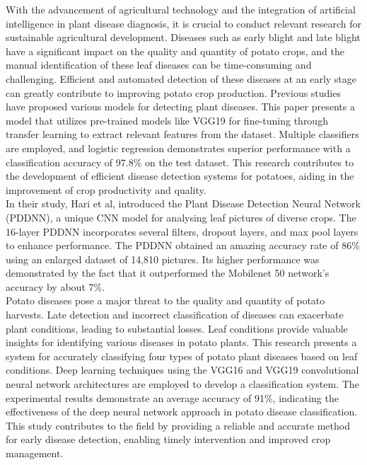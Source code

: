 \documentclass[conference]{IEEEtran}
\begin{document}
With the advancement of agricultural technology and the integration of artificial intelligence in plant disease diagnosis, it is crucial to conduct relevant research for sustainable agricultural development. Diseases such as early blight and late blight have a significant impact on the quality and quantity of potato crops, and the manual identification of these leaf diseases can be time-consuming and challenging. Efficient and automated detection of these diseases at an early stage can greatly contribute to improving potato crop production. Previous studies have proposed various models for detecting plant diseases. \cite{9121067} This paper presents a model that utilizes pre-trained models like VGG19 for fine-tuning through transfer learning to extract relevant features from the dataset. Multiple classifiers are employed, and logistic regression demonstrates superior performance with a classification accuracy of 97.8\% on the test dataset. \cite{9121067}This research contributes to the development of efficient disease detection systems for potatoes, aiding in the improvement of crop productivity and quality.\\

In their study, Hari et al\cite{8899748}, introduced the Plant Disease Detection Neural Network (PDDNN), a unique CNN model for analysing leaf pictures of diverse crops. The 16-layer PDDNN incorporates several filters, dropout layers, and max pool layers to enhance performance. The PDDNN obtained an amazing accuracy rate of 86\% using an enlarged dataset of 14,810 pictures. Its higher performance was demonstrated by the fact that it outperformed the Mobilenet 50 network's accuracy by about 7\%.\\

Potato diseases pose a major threat to the quality and quantity of potato harvests. Late detection and incorrect classification of diseases can exacerbate plant conditions, leading to substantial losses. Leaf conditions provide valuable insights for identifying various diseases in potato plants. \cite{9231784} This research presents a system for accurately classifying four types of potato plant diseases based on leaf conditions. Deep learning techniques using the VGG16 and VGG19 convolutional neural network architectures are employed to develop a classification system. The experimental results demonstrate an average accuracy of 91\%, indicating the effectiveness of the deep neural network approach in potato disease classification. This study contributes to the field by providing a reliable and accurate method for early disease detection, enabling timely intervention and improved crop management.\\
\end{document}
